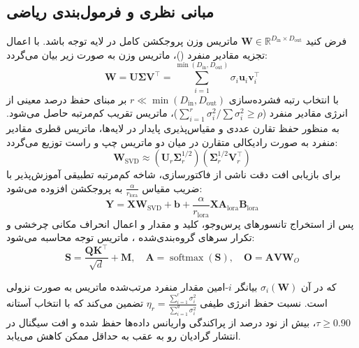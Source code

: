 \subsection{مبانی نظری و فرمول‌بندی ریاضی}
فرض کنید $\mathbf{W} \in \mathbb{R}^{D_{\text{in}} \times D_{\text{out}}}$ ماتریس وزن پروجکشن کامل در لایه توجه باشد. با اعمال تجزیه مقادیر منفرد ()، ماتریس وزن به صورت زیر بیان می‌گردد:
\begin{equation}
\mathbf{W} = \mathbf{U} \mathbf{\Sigma} \mathbf{V}^\top = \sum_{i=1}^{\min(D_{\text{in}}, D_{\text{out}})} \sigma_i \mathbf{u}_i \mathbf{v}_i^\top
\end{equation}
با انتخاب رتبه فشرده‌سازی $r \ll \min(D_{\text{in}}, D_{\text{out}})$ بر مبنای حفظ درصد معینی از انرژی مقادیر منفرد ($\sum_{i=1}^r \sigma_i^2 / \sum \sigma_i^2 \ge \rho$)، ماتریس تقریب کم‌مرتبه حاصل می‌شود. به منظور حفظ تقارن عددی و مقیاس‌پذیری پایدار در لایه‌ها، ماتریس قطری مقادیر منفرد به صورت رادیکالی متقارن در میان دو ماتریس چپ و راست توزیع می‌گردد:
\begin{equation}
\mathbf{W}_{\text{SVD}} \approx \left(\mathbf{U}_r \mathbf{\Sigma}_r^{1/2}\right) \left(\mathbf{\Sigma}_r^{1/2} \mathbf{V}_r^\top\right)
\end{equation}
برای بازیابی افت دقت ناشی از فاکتورسازی، شاخه کم‌مرتبه تطبیقی آموزش‌پذیر  با ضریب مقیاس $\frac{\alpha}{r_{\text{lora}}}$ به پروجکشن افزوده می‌شود:
\begin{equation}
\mathbf{Y} = \mathbf{X} \mathbf{W}_{\text{SVD}} + \mathbf{b} + \frac{\alpha}{r_{\text{lora}}} \mathbf{X} \mathbf{A}_{\text{lora}} \mathbf{B}_{\text{lora}}
\end{equation}
پس از استخراج تانسورهای پرس‌وجو، کلید و مقدار و اعمال انحراف مکانی چرخشی  و تکرار سرهای گروه‌بندی‌شده ، ماتریس توجه محاسبه می‌شود:
\begin{equation}
\mathbf{S} = \frac{\mathbf{Q} \mathbf{K}^\top}{\sqrt{d}} + \mathbf{M}, \quad \mathbf{A} = \operatorname{softmax}(\mathbf{S}), \quad \mathbf{O} = \mathbf{A} \mathbf{V} \mathbf{W}_O
\end{equation}

که در آن $\sigma_i(\mathbf{W})$ بیانگر $i$-امین مقدار منفرد مرتب‌شده ماتریس به صورت نزولی است. نسبت حفظ انرژی طیفی $\eta_r = \frac{\sum_{i=1}^r \sigma_i^2}{\sum_{i=1}^{d} \sigma_i^2}$ تضمین می‌کند که با انتخاب آستانه $\tau \ge 0.90$، بیش از نود درصد از پراکندگی واریانس داده‌ها حفظ شده و افت سیگنال در انتشار گرادیان رو به عقب به حداقل ممکن کاهش می‌یابد.

